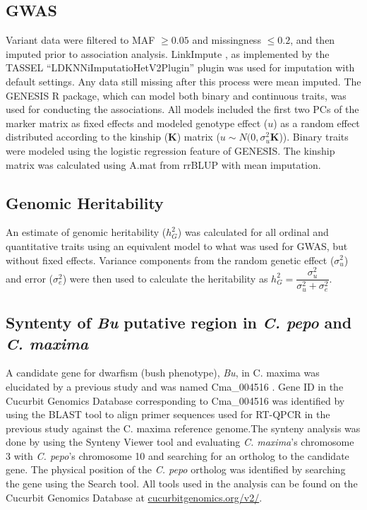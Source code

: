 \documentclass[utf8]{FrontiersinHarvard} %
\begin{document}
\subsection{GWAS}
Variant data were filtered to MAF $\geq 0.05$  and missingness $\leq 0.2$, and then imputed prior to association analysis. LinkImpute \citep{Money2015}, as implemented by the TASSEL \citep{Bradbury2007} “LDKNNiImputatioHetV2Plugin” plugin was used for imputation with default settings. Any data still missing after this process were mean imputed. The GENESIS \citep{Gogarten2019} R package, which can model both binary and continuous traits, was used for conducting the associations. All models included the first two PCs of the marker matrix as fixed effects and modeled genotype effect ($u$) as a random effect distributed according to the kinship ($\mathbf{K}$) matrix ($u \sim N(0,\sigma_{u}^{2}\textbf{K}$)). Binary traits were modeled using the logistic regression feature of GENESIS. The kinship matrix was calculated using A.mat from rrBLUP \citep{Endelman2011} with mean imputation.

\subsection{Genomic Heritability}

An estimate of genomic heritability ($h_{G}^{2}$) \citep{Campos2015} was calculated for all ordinal and quantitative traits using an equivalent model to what was used for GWAS, but without fixed effects. Variance components from the random genetic effect ($\sigma_{u}^{2}$) and error ($\sigma_{e}^{2}$) were then used to calculate the heritability as $h_{G}^{2} = \dfrac{\sigma_{u}^{2}}{\sigma_{u}^{2} + \sigma_{e}^{2}}$.

\subsection{Syntenty of \textit{Bu} putative region in \textit{C. pepo} and \textit{C. maxima}}
 A candidate gene for dwarfism (bush phenotype), \textit{Bu}, in C. maxima was elucidated by a previous study and was named Cma\_004516 \citep{Zhang2015}. Gene ID in the Cucurbit Genomics Database corresponding to Cma\_004516 was identified by using the BLAST tool to align primer sequences used for RT-QPCR in the previous study \citep{Zhang2015} against the C. maxima reference genome.The synteny analysis was done by using the Synteny Viewer tool and evaluating \textit{C. maxima}’s chromosome 3 with \textit{C. pepo}’s chromosome 10 and searching for an ortholog to the candidate gene. The physical position of the \textit{C. pepo} ortholog was identified by searching the gene using the Search tool. All tools used in the analysis can be found on the Cucurbit Genomics Database at \href{http://www.cucurbitgenomics.org/v2/}{cucurbitgenomics.org/v2/}.
\end{document}
